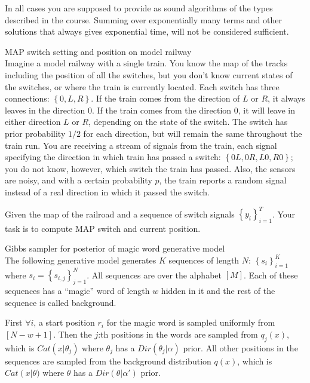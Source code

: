 \documentclass[a4paper,twoside=false,abstract=false,numbers=noenddot,
titlepage=false,headings=small,parskip=half,version=last]{scrartcl}
\begin{document}
In all cases you are supposed to provide as sound algorithms of the types
described in the course.
Summing over exponentially many terms and other
solutions that always gives exponential time, will not be considered
sufficient.
\begin{exercise}{2} MAP switch setting and position on model railway \\ 
    Imagine a model railway with a single train. You know the map of the tracks
    including the position of all the switches, but you don't know current states
    of the switches, or where the train is currently located. Each switch has three
    connections: $\left\{0,L,R\right\}$. If the train comes from the direction of
    $L$ or $R$, it always
    leaves in the direction $0$. If the train comes from the direction $0$, it will
    leave in either direction $L$ or $R$, depending on the state of the switch. The
    switch has prior probability $1/2$ for each direction, but will remain the same
    throughout the train run. You are receiving a stream of signals from the train,
    each signal specifying the direction in which train has passed a switch: 
    $\left\{0L,0R,L0,R0\right\}$; you do not know, however, 
    which switch the train has passed.
    Also, the sensors are noisy, and with a certain probability $p$, the train
    reports a random signal instead of a real direction in which it passed the
    switch.

    Given the map of the railroad and a sequence of switch signals
    $\left\{ y_i \right\}_{i=1}^T$. Your task is to compute MAP switch and current
    position.
\end{exercise}
\begin{solution}
    
\end{solution}

\begin{exercise}{3}Gibbs sampler for posterior of magic word generative model\\
    The following generative model generates $K$ sequences of length $N$:
    $\left\{s_i\right\}_{i=1}^K$ where $s_i=\left\{s_{i,j}\right\}_{j=1}^N$.
    All sequences are over the alphabet $\left[M\right]$. Each of these
    sequences has a ``magic'' word of length $w$ hidden in it and the rest of
    the sequence is called background.

    First $\forall i$, a start position $r_i$ for the magic word is sampled
    uniformly from $\left[N-w+1\right]$. Then the $j$:th positions in the words
    are sampled from $q_j(x)$, which is $Cat\left(x|\theta_j\right)$ where 
    $\theta_j$ has a $Dir\left(\theta_j|\alpha\right)$ prior. All other
    positions in the sequences are sampled from the background distribution
    $q(x)$, which is $Cat\left(x|\theta)$ where $\theta$ has a
    $Dir\left(\theta|\alpha'\right)$ prior.
\end{exercise}
\begin{solution}
    
\end{solution}
\end{document}
